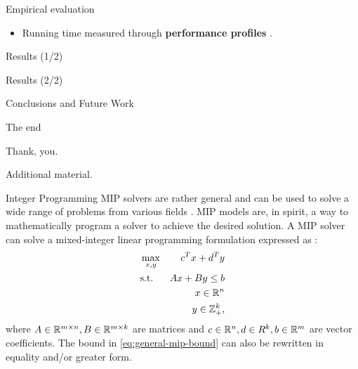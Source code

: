 \begin{frame}{Empirical evaluation}
	\begin{itemize}
		\item Running time measured through \textbf{performance profiles} \parencite{dolan2002}.
	\end{itemize}
\end{frame}

\begin{frame}{Results (1/2)}

\end{frame}

\begin{frame}{Results (2/2)}

\end{frame}

\begin{frame}{Conclusions and Future Work}
	\cite{jepsen2014}
\end{frame}

\begin{frame}{The end}
	\begin{center}
		\begingroup
		\fontsize{18pt}{18pt}\selectfont
		Thank, you.
		\endgroup
	\end{center}
\end{frame}

\appendix

\begin{frame}
\end{frame}

\begin{frame}
	\begin{center}
		\begingroup
		\fontsize{18pt}{18pt}\selectfont
		Additional material.
		\endgroup
	\end{center}
\end{frame}

\begin{frame}{Integer Programming}
	MIP solvers are rather general and can be used to solve a wide range of problems from various fields \parencite{bixby2007progress}.
	MIP models are, in spirit, a way to mathematically program a solver to achieve the desired solution.
	A MIP solver can solve a mixed-integer linear programming formulation
	expressed as \parencite{wolsey1999integer}:
	\begin{align}
		 & \max_{x, y} & c^T x + d^T y                                 \\
		 & \text{s.t.} & A x + B y \le b  \label{eq:general-mip-bound} \\
		 &             & x \in \mathbb R^n                                    \\
		 &             & y \in \mathbb Z_{+}^k,
	\end{align}
	where $A \in \mathbb R^{m \times n}, B \in \mathbb R^{m \times k}$ are matrices and
	$c \in \mathbb R^n, d \in R^k, b \in \mathbb R^m$ are vector coefficients.
	The bound in \cref{eq:general-mip-bound} can also be rewritten in equality and/or greater form.

\end{frame}

